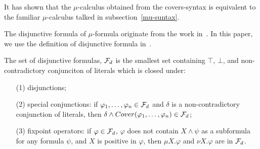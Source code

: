 \documentclass[runningheads]{llncs}
\begin{document}
It has shown that the $\mu$-calculus obtained from the covers-syntax is equivalent to the familiar $\mu$-calculus talked in subsection~\ref{mu-suntax}\cite{d2006modal}.

The disjunctive formula of $\mu$-formula originate from the work in~\cite{janin1995automata}. 
In this paper, we use the definition of disjunctive formula in~\cite{d2006modal}. 
\begin{definition}
	The set of disjunctive formulas, ${\cal F}_d$ is the smallest set containing $\top$, $\bot$, and non-contradictory conjunciton of literals which is closed under:
	\begin{itemize}
		\item[(1)] disjunctions;
		\item[(2)] special conjunctions: if $\varphi_1, \dots, \varphi_n\in {\cal F}_d$ and $\delta$ is a non-contradictory
		conjunction of literals, then $\delta \wedge Cover(\varphi_1, \dots, \varphi_n) \in {\cal F}_d$;
		\item[(3)] fixpoint operators: if $\varphi\in  {\cal F}_d$, $\varphi$ does not contain $X \wedge \psi$ as a subformula for
		any formula $\psi$, and $X$ is positive in $\varphi$, then $\mu X. \varphi$ and $\nu X. \varphi$ are in ${\cal F}_d$.
	\end{itemize}
	 
\end{definition}
\end{document}
